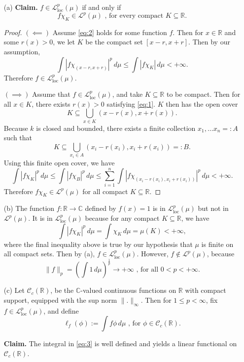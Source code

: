 \documentclass[12pt]{article}
\newcommand{\R}{\mathbb{R}}
\newcommand{\C}{\mathbb{C}}
\newcommand{\eq}[1]{\begin{equation*}#1\end{equation*}}
\newcommand{\qeq}[1]{\begin{equation}#1\end{equation}}
\newcommand{\loc}{\mathcal{L}^p_\text{loc} (\mu)}
\newcommand{\clc}{\mathcal{C}_c(\R)}
\begin{document}
\begin{itemize}
    \item [(a)] \textbf{Claim. } $f \in \loc$ if and only if 
    \qeq{f \chi_K \in \mathcal{L}^p (\mu) \text{ , for every compact } K \subseteq \R \label{eq:2}.}

    \begin{proof}
        $(\impliedby)$ Assume \eqref{eq:2} holds for some function $f$. Then for $x \in \R$ and some $r(x) > 0$, we let $K$ be the compact set $[x-r, x+r]$. Then by our assumption,
        \eq{\int |f \chi_{(x-r, x+r)}|^p \,d \mu \leq \int |f \chi_K| \,d \mu < +\infty.}
        Therefore $f \in \loc$.

        $(\implies)$ Assume that $f \in \loc$, and take $K \subseteq \R$ to be compact. Then for all $x \in K$, there exists $r(x) > 0$ satisfying \eqref{eq:1}. $K$ then has the open cover
        \eq{K \subseteq \bigcup_{x \in K} (x-r(x), x + r(x)).}
        Because $k$ is closed and bounded, there exists a finite collection $x_1, \dots x_n =: A$ such that
        \eq{K \subseteq \bigcup_{x_i \in A} (x_i-r(x_i), x_i+r(x_i)) =:B.}
        Using this finite open cover, we have
        \eq{\int |f \chi_K|^p \,d \mu \leq \int |f \chi_B|^p \,d\mu \leq \sum_{i=1}^{n} \int |f \chi_{(x_i-r(x_i), x_i + r(x_i))}|^p \,d\mu < +\infty.}
        Therefore $f\chi_K \in \mathcal{L}^p(\mu)$ for all compact $K \subseteq \R$.
    \end{proof}
    \item [(b)] The function $f : \R \to \C$ defined by $f(x) = 1$ is in $\loc$ but not in $\mathcal{L}^p (\mu)$. It is in $\loc$ because for any compact $K \subseteq \R$, we have
    \eq{\int |f \chi_K|^p \,d\mu = \int \chi_K \,d\mu = \mu(K) < +\infty,} where the final inequality above is true by our hypothesis that $\mu$ is finite on all compact sets. Then by (a), $f \in \loc$.
    However, $f \notin \mathcal{L}^p(\mu)$, because 
    \eq{\|f\|_p = \left(\int 1 \,d\mu\right)^\frac{1}{p} \to +\infty \text{ , for all } 0 < p < +\infty.}

    \item [(c)] Let $\clc$, be the $\C$-valued continuous functions on $\R$ with compact support, equipped with the sup norm $\|.\|_\infty$. Then for $1 \leq p < \infty$, fix $f \in \loc$, and define 
    \qeq{\ell_f(\phi) := \int f\phi \,d\mu \text{ , for } \phi \in \clc. \label{eq:3}}

    \textbf{Claim. } The integral in \eqref{eq:3} is well defined and yields a linear functional on $\clc$.


\end{itemize}
\end{document}
